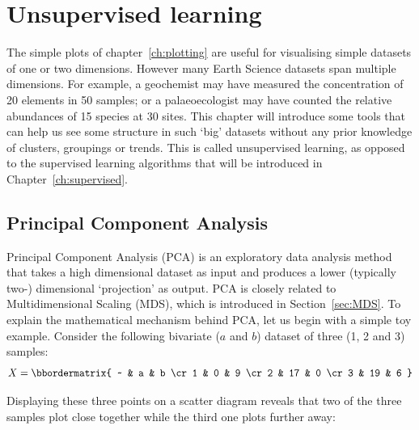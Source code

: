 \chapter{Unsupervised learning}
\label{ch:unsupervised}

The simple plots of chapter~\ref{ch:plotting} are useful for
visualising simple datasets of one or two dimensions. However many
Earth Science datasets span multiple dimensions. For example, a
geochemist may have measured the concentration of 20 elements in 50
samples; or a palaeoecologist may have counted the relative abundances
of 15 species at 30 sites. This chapter will introduce some tools that
can help us see some structure in such `big' datasets without any
prior knowledge of clusters, groupings or trends.  This is called
unsupervised learning, as opposed to the supervised learning
algorithms that will be introduced in Chapter~\ref{ch:supervised}.

\section{Principal Component Analysis}
\label{sec:PCA}

Principal Component Analysis (PCA) is an exploratory data analysis
method that takes a high dimensional dataset as input and produces a
lower (typically two-) dimensional `projection' as output. PCA is
closely related to Multidimensional Scaling (MDS), which is introduced
in Section~\ref{sec:MDS}. To explain the mathematical mechanism behind
PCA, let us begin with a simple toy example.  Consider the following
bivariate ($a$ and $b$) dataset of three (1, 2 and 3) samples:
\begin{equation}
  X = \bbordermatrix{
    ~ & a  & b \cr
    1 & 0  & 9 \cr
    2 & 17 & 0 \cr
    3 & 19 & 6
  }
  \label{eq:X}
\end{equation}

Displaying these three points on a scatter diagram reveals that two of
the three samples plot close together while the third one plots
further away:

